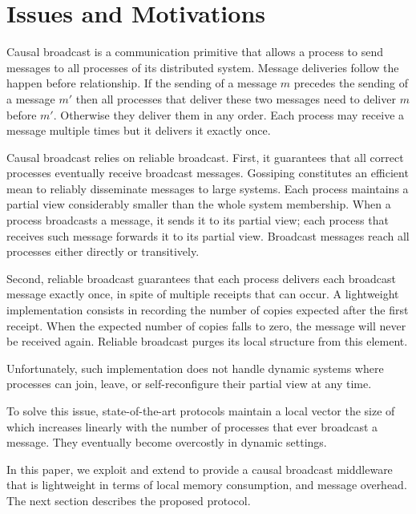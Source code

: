 
\section{Issues and Motivations}
\label{sec:motivations}

Causal broadcast is a communication primitive that allows a process to send
messages to all processes of its distributed system. Message deliveries follow
the happen before relationship. If the sending of a message $m$ precedes the
sending of a message $m'$ then all processes that deliver these two messages
need to deliver $m$ before $m'$. Otherwise they deliver them in any order. Each
process may receive a message multiple times but it delivers it exactly once.

Causal broadcast relies on reliable broadcast. First, it guarantees that all
correct processes eventually receive broadcast messages. Gossiping constitutes
an efficient mean to reliably disseminate messages to large systems. Each
process maintains a partial view considerably smaller than the whole system
membership. When a process broadcasts a message, it sends it to its partial
view; each process that receives such message forwards it to its partial
view. Broadcast messages reach all processes either directly or transitively.

Second, reliable broadcast guarantees that each process delivers each broadcast
message exactly once, in spite of multiple receipts that can occur. A
lightweight implementation consists in recording the number of copies expected
after the first receipt. When the expected number of copies falls to zero, the
message will never be received again. Reliable broadcast purges its local
structure from this element. 

Unfortunately, such implementation does not handle dynamic systems where
processes can join, leave, or self-reconfigure their partial view at any
time.  

To solve this issue, state-of-the-art protocols maintain a local vector the size
of which increases linearly with the number of processes that ever broadcast a
message. They eventually become overcostly in dynamic settings.

In this paper, we exploit and extend \PCBROADCAST to provide a causal broadcast
middleware that is lightweight in terms of local memory consumption, and message
overhead. The next section describes the proposed protocol.

